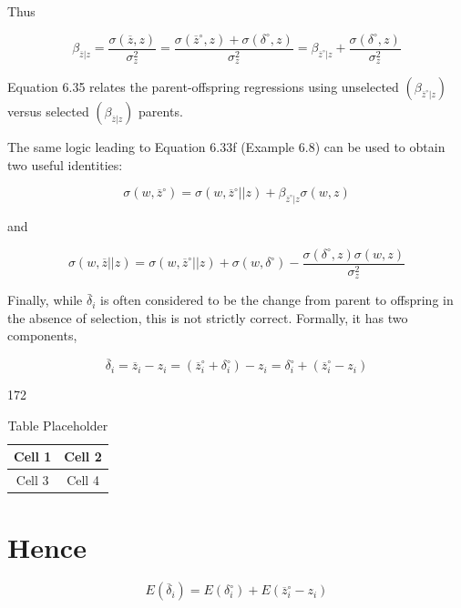 \documentclass{article}
\begin{document}
Thus

\begin{equation}
\beta_{\overline{z}|z}=\frac{\sigma(\overline{z},z)}{\sigma_{z}^{2}}=\frac{\sigma(\overline{z}^{\circ},z)+\sigma(\delta^{\circ},z)}{\sigma_{z}^{2}}=\beta_{\overline{z}^{\circ}|z}+\frac{\sigma(\delta^{\circ},z)}{\sigma_{z}^{2}}
\tag{6.35}
\label{eq:6_35}
\end{equation}

Equation 6.35 relates the parent-offspring regressions using unselected  $ (\beta_{\overline{z}^{\circ}|z}) $ versus selected  $ (\beta_{\overline{z}|z}) $ parents.

The same logic leading to Equation 6.33f (Example 6.8) can be used to obtain two useful identities:

\begin{equation}
\sigma(w,\overline{{z}}^{\circ})=\sigma(w,\overline{{z}}^{\circ}||z)+\beta_{\overline{{z}}^{\circ}|z}\sigma(w,z)
\tag{6.36a}
\label{eq:6_36a}
\end{equation}

and

\begin{equation}
\sigma(w,\overline{z}||z)=\sigma(w,\overline{z}^{\circ}||z)+\sigma(w,\delta^{\circ})-\frac{\sigma(\delta^{\circ},z)\sigma(w,z)}{\sigma_{z}^{2}}
\tag{6.36b}
\label{eq:6_36b}
\end{equation}

Finally, while  $ \bar{\delta}_{i} $ is often considered to be the change from parent to offspring in the absence of selection, this is not strictly correct. Formally, it has two components,

\begin{equation}
\overline{\delta}_{i}=\overline{z}_{i}-z_{i}=(\overline{z}_{i}^{\circ}+\delta_{i}^{\circ})-z_{i}=\delta_{i}^{\circ}+(\overline{z}_{i}^{\circ}-z_{i})
\tag{6.37}
\label{eq:6_37}
\end{equation}

172

\begin{table}[h]
\centering
\begin{tabular}{|c|c|}
\hline
Cell 1 & Cell 2 \\
\hline
Cell 3 & Cell 4 \\
\hline
\end{tabular}
\caption{Table Placeholder}
\end{table}

\section{Hence}
\begin{equation}
E(\overline{{\delta}}_{i})=E(\delta_{i}^{\circ})+E(\overline{{z}}_{i}^{\circ}-z_{i})
\tag{6.38}
\label{eq:6_38}
\end{equation}
\end{document}
